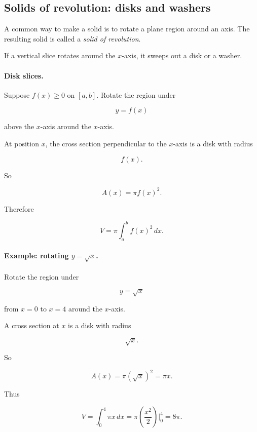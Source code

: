 \subsection{Solids of revolution: disks and washers}
\label{subsec:solids-of-revolution-disks-washers}

A common way to make a solid is to rotate a plane region around an axis.  The resulting
solid is called a \emph{solid of revolution}.

If a vertical slice rotates around the \(x\)-axis, it sweeps out a disk or a washer.

\paragraph{Disk slices.}
Suppose \(f(x)\ge0\) on \([a,b]\).  Rotate the region under

\[
y=f(x)
\]

above the \(x\)-axis around the \(x\)-axis.

At position \(x\), the cross section perpendicular to the \(x\)-axis is a disk with radius

\[
f(x).
\]

So

\[
A(x)=\pi f(x)^2.
\]

Therefore

\[
\boxed{
V=\pi\int_a^b f(x)^2\,dx.
}
\]

\paragraph{Example: rotating \(y=\sqrt{x}\).}
Rotate the region under

\[
y=\sqrt{x}
\]

from \(x=0\) to \(x=4\) around the \(x\)-axis.

A cross section at \(x\) is a disk with radius

\[
\sqrt{x}.
\]

So

\[
A(x)=\pi(\sqrt{x})^2=\pi x.
\]

Thus

\[
V=\int_0^4 \pi x\,dx
=
\pi\left(\frac{x^2}{2}\right)\Big|_0^4
=
\boxed{8\pi}.
\]


